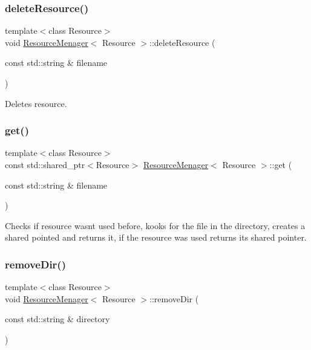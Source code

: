 \subsubsection{\texorpdfstring{deleteResource()}{deleteResource()}\hspace{0.1cm}{\footnotesize\ttfamily [2/2]}}
{\footnotesize\ttfamily template$<$class Resource$>$ \\
void \mbox{\hyperlink{class_resource_menager}{Resource\+Menager}}$<$ Resource $>$\+::delete\+Resource (\begin{DoxyParamCaption}\item[{const std\+::string \&}]{filename }\end{DoxyParamCaption})}



Deletes resource. 

\mbox{\label{class_resource_menager_a1c75062d799f0baa37cfa4bbbc9a5779}} 
\subsubsection{\texorpdfstring{get()}{get()}}
{\footnotesize\ttfamily template$<$class Resource$>$ \\
const std\+::shared\+\_\+ptr$<$Resource$>$ \mbox{\hyperlink{class_resource_menager}{Resource\+Menager}}$<$ Resource $>$\+::get (\begin{DoxyParamCaption}\item[{const std\+::string \&}]{filename }\end{DoxyParamCaption})}



Checks if resource wasn\textquotesingle{}t used before, kooks for the file in the directory, creates a shared pointed and returns it, if the resource was used returns it\textquotesingle{}s shared pointer. 

\mbox{\label{class_resource_menager_a795728420523e598b095abded51019b4}} 
\subsubsection{\texorpdfstring{removeDir()}{removeDir()}}
{\footnotesize\ttfamily template$<$class Resource$>$ \\
void \mbox{\hyperlink{class_resource_menager}{Resource\+Menager}}$<$ Resource $>$\+::remove\+Dir (\begin{DoxyParamCaption}\item[{const std\+::string \&}]{directory }\end{DoxyParamCaption})}




